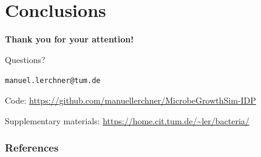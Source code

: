 \documentclass[10pt,t]{beamer}
\begin{document}

\section*{Conclusions}

\begin{frame}
    \begin{center}
        \vspace{1cm}
        {\LARGE \textbf{Thank you for your attention!}}

        \vspace{1.5cm}

        \Huge{Questions?}

        \vspace{.8cm}

        \small
        \texttt{manuel.lerchner@tum.de}

        \vspace{0.3cm}
        Code: \url{https://github.com/manuellerchner/MicrobeGrowthSim-IDP}

        \vspace{0.2cm}
        Supplementary materials: \url{https://home.cit.tum.de/~ler/bacteria/}
    \end{center}
\end{frame}

\begin{frame}
    \frametitle{References}
    \scriptsize
    
    
\end{frame}

\appendix
\end{document}
